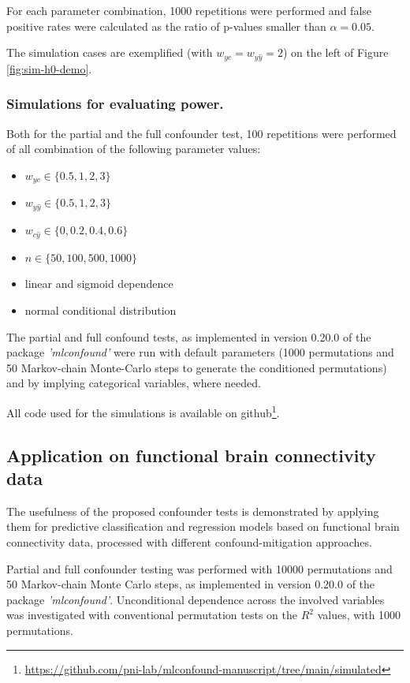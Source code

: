 \documentclass{article}
\begin{document}
For each parameter combination, 1000 repetitions were performed and false positive rates were calculated as the ratio of p-values smaller than $\alpha = 0.05$.

The simulation cases are exemplified (with $w_{yc} = w_{y\hat{y}} = 2$) on the left of Figure \ref{fig:sim-h0-demo}.

\subsubsection*{Simulations for evaluating power.}

Both for the partial and the full confounder test, 100 repetitions were performed of all combination of the following parameter values: 
\begin{itemize}
    \item $w_{yc} \in \{0.5, 1, 2, 3\}$
    \item $w_{y\hat{y}} \in \{0.5, 1, 2, 3\}$
    \item $w_{c\hat{y}} \in \{0, 0.2, 0.4, 0.6\}$
    \item $n \in \{50, 100, 500, 1000\}$
    \item linear and sigmoid dependence
    \item normal conditional distribution
\end{itemize}

The partial and full confound tests, as implemented in version 0.20.0 of the package \emph{'mlconfound'} were run with default parameters (1000 permutations and 50 Markov-chain Monte-Carlo steps to generate the conditioned permutations) and by implying categorical variables, where needed.

All code used for the simulations is available on github\footnote{\href{https://github.com/pni-lab/mlconfound-manuscript/tree/main/simulated}{https://github.com/pni-lab/mlconfound-manuscript/tree/main/simulated}}.

\subsection{Application on functional brain connectivity data}

The usefulness of the proposed confounder tests is demonstrated by applying them for predictive classification and regression models based on functional brain connectivity data, processed with different confound-mitigation approaches. 

Partial and full confounder testing was performed with 10000 permutations and 50 Markov-chain Monte Carlo steps, as implemented in version 0.20.0 of the package \emph{'mlconfound'}. Unconditional dependence across the involved variables was investigated with conventional permutation tests on the $R^2$ values, with 1000 permutations. 
\end{document}
